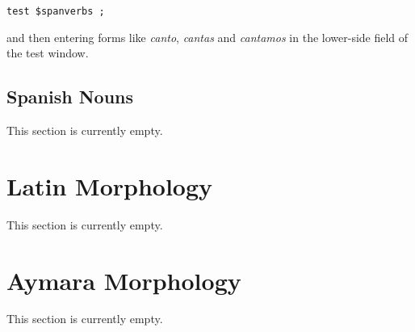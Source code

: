 \begin{Verbatim}
test $spanverbs ;
\end{Verbatim}

\noindent
and then entering forms like \emph{canto}, \emph{cantas} and \emph{cantamos}
in the lower-side field of the test window.


\subsection{Spanish Nouns}

This section is currently empty.

\section{Latin Morphology}

This section is currently empty.

\section{Aymara Morphology}

This section is currently empty.
